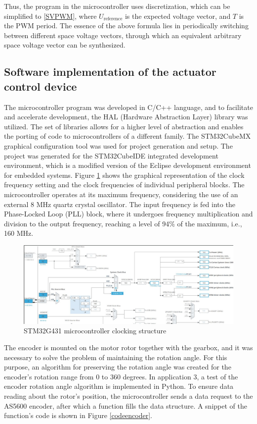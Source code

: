 Thus, the program in the microcontroller uses discretization, which can be simplified to \ref{SVPWM}, where \(U_{\text{reference}}\) is the expected voltage vector, and \(T\) is the PWM period. The essence of the above formula lies in periodically switching between different space voltage vectors, through which an equivalent arbitrary space voltage vector can be synthesized.




\subsection{Software implementation of the actuator control device}
The microcontroller program was developed in C/C++ language, and to facilitate and accelerate development, the HAL (Hardware Abstraction Layer) library was utilized. The set of libraries allows for a higher level of abstraction and enables the porting of code to microcontrollers of a different family. The STM32CubeMX graphical configuration tool was used for project generation and setup. The project was generated for the STM32CubeIDE integrated development environment, which is a modified version of the Eclipse development environment for embedded systems. Figure \ref{STM32G431MX} shows the graphical representation of the clock frequency setting and the clock frequencies of individual peripheral blocks. The microcontroller operates at its maximum frequency, considering the use of an external 8 MHz quartz crystal oscillator. The input frequency is fed into the Phase-Locked Loop (PLL) block, where it undergoes frequency multiplication and division to the output frequency, reaching a level of 94\% of the maximum, i.e., 160 MHz.


\begin{figure}[H]
	\centering
	\includegraphics[width=\textwidth]{Src/images/CubeMX.png}
	\caption{STM32G431 microcontroller clocking structure}
	\label{STM32G431MX}
\end{figure}

The encoder is mounted on the motor rotor together with the gearbox, and it was necessary to solve the problem of maintaining the rotation angle. For this purpose, an algorithm for preserving the rotation angle was created for the encoder's rotation range from 0 to 360 degrees. In application 3, a test of the encoder rotation angle algorithm is implemented in Python. To ensure data reading about the rotor's position, the microcontroller sends a data request to the AS5600 encoder, after which a function fills the data structure. A snippet of the function's code is shown in Figure \ref{codeencoder}.



